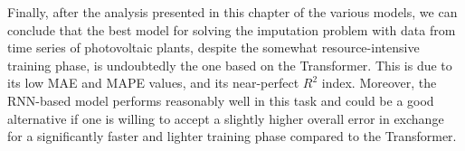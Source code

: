 Finally, after the analysis presented in this chapter of the various models, we can conclude that the best model for solving the imputation problem with data from time series of photovoltaic plants, despite the somewhat resource-intensive training phase, is undoubtedly the one based on the Transformer. This is due to its low MAE and MAPE values, and its near-perfect $R^2$ index. Moreover, the RNN-based model performs reasonably well in this task and could be a good alternative if one is willing to accept a slightly higher overall error in exchange for a significantly faster and lighter training phase compared to the Transformer.


